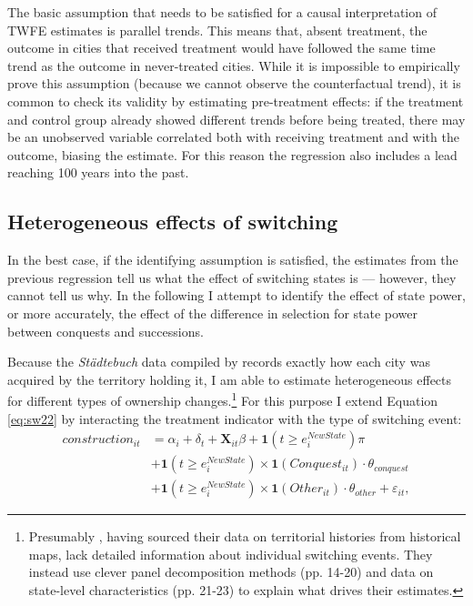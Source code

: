 \documentclass[11pt, a4paper]{article}
\begin{document}
The basic assumption that needs to be satisfied for a causal interpretation of TWFE estimates is parallel trends. This means that, absent treatment, the outcome in cities that received treatment would have followed the same time trend as the outcome in never-treated cities. While it is impossible to empirically prove this assumption (because we cannot observe the counterfactual trend), it is common to check its validity by estimating pre-treatment effects: if the treatment and control group already showed different trends before being treated, there may be an unobserved variable correlated both with receiving treatment and with the outcome, biasing the estimate. For this reason the regression also includes a lead reaching 100 years into the past.


\subsection{Heterogeneous effects of switching}

In the best case, if the identifying assumption is satisfied, the estimates from the previous regression tell us what the effect of switching states is --- however, they cannot tell us why. In the following I attempt to identify the effect of state power, or more accurately, the effect of the difference in selection for state power between conquests and successions. 

Because the \textit{Städtebuch} data compiled by \cite{pt2} records exactly how each city was acquired by the territory holding it, I am able to estimate heterogeneous effects for different types of ownership changes.\footnote
{
Presumably \cite{schoenholzer2022}, having sourced their data on territorial histories from historical maps, lack detailed information about individual switching events. They instead use clever panel decomposition methods (pp. 14-20) and data on state-level characteristics (pp. 21-23) to explain what drives their estimates.
}
For this purpose I extend Equation \eqref{eq:sw22} by interacting the treatment indicator with the type of switching event:
\begin{equation}
\label{eq:baseline}
\begin{split}
    construction_{it} &= \alpha_i + \delta_t + \mathbf{X}_{it} \beta + 
    \mathbf{1}(t \ge e^{NewState}_i) \pi \\
    &+ \mathbf{1}(t \ge e^{NewState}_i) \times
    \mathbf{1}(Conquest_{it}) \cdot \theta_{conquest} \\
    &+ \mathbf{1}(t \ge e^{NewState}_i) \times
    \mathbf{1}(Other_{it}) \cdot \theta_{other} + \varepsilon_{it},
\end{split}
\end{equation}
\end{document}
